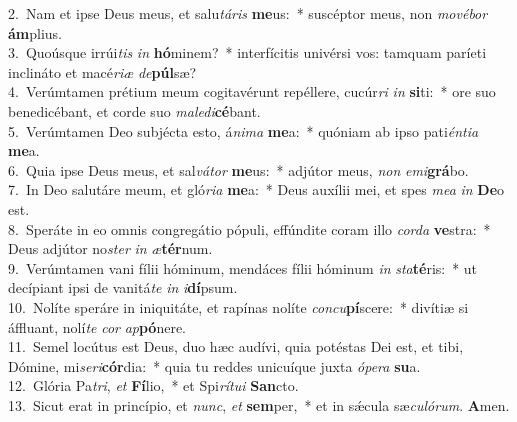 {2.~}Nam et ipse Deus meus, et salu\textit{tá}\textit{ris} \textbf{me}us:~* suscéptor meus, non \textit{mo}\textit{vé}\textit{bor} \textbf{ám}plius.\\
{3.~}Quoúsque irrúi\textit{tis} \textit{in} \textbf{hó}minem?~* interfícitis univérsi vos: tamquam paríeti inclináto et macé\textit{ri}\textit{æ} \textit{de}\textbf{púl}sæ?\\
{4.~}Verúmtamen prétium meum cogitavérunt repéllere, cucúr\textit{ri} \textit{in} \textbf{si}ti:~* ore suo benedicébant, et corde suo \textit{ma}\textit{le}\textit{di}\textbf{cé}bant.\\
{5.~}Verúmtamen Deo subjécta esto, á\textit{ni}\textit{ma} \textbf{me}a:~* quóniam ab ipso pati\textit{én}\textit{ti}\textit{a} \textbf{me}a.\\
{6.~}Quia ipse Deus meus, et sal\textit{vá}\textit{tor} \textbf{me}us:~* adjútor meus, \textit{non} \textit{e}\textit{mi}\textbf{grá}bo.\\
{7.~}In Deo salutáre meum, et gló\textit{ri}\textit{a} \textbf{me}a:~* Deus auxílii mei, et spes \textit{me}\textit{a} \textit{in} \textbf{De}o est.\\
{8.~}Speráte in eo omnis congregátio pópuli, effúndite coram illo \textit{cor}\textit{da} \textbf{ve}stra:~* Deus adjútor no\textit{ster} \textit{in} \textit{æ}\textbf{tér}num.\\
{9.~}Verúmtamen vani fílii hóminum, mendáces fílii hóminum \textit{in} \textit{sta}\textbf{té}ris:~* ut decípiant ipsi de vanitá\textit{te} \textit{in} \textit{i}\textbf{dí}psum.\\
{10.~}Nolíte speráre in iniquitáte, et rapínas nolíte \textit{con}\textit{cu}\textbf{pí}scere:~* divítiæ si áffluant, nolí\textit{te} \textit{cor} \textit{ap}\textbf{pó}nere.\\
{11.~}Semel locútus est Deus, duo hæc audívi, quia potéstas Dei est, et tibi, Dómine, mi\textit{se}\textit{ri}\textbf{cór}dia:~* quia tu reddes unicuíque juxta \textit{ó}\textit{pe}\textit{ra} \textbf{su}a.\\
{12.~}Glória Pa\textit{tri}, \textit{et} \textbf{Fí}lio,~* et Spi\textit{rí}\textit{tu}\textit{i} \textbf{San}cto.\\
{13.~}Sicut erat in princípio, et \textit{nunc}, \textit{et} \textbf{sem}per,~* et in sǽcula sæ\textit{cu}\textit{ló}\textit{rum}. \textbf{A}men.\\
